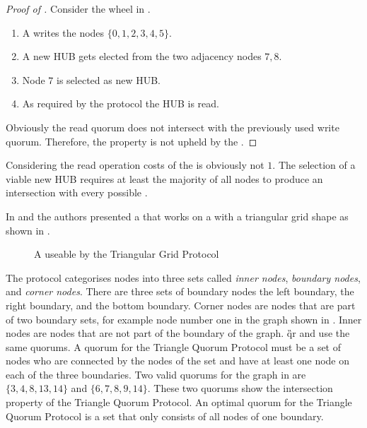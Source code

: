 \documentclass[conference]{IEEEtran}
\begin{document}
\begin{proof}[Proof of ]
Consider the wheel in .
\begin{enumerate}
	\item A  writes the nodes \(\{0,1,2,3,4,5\}\).
	\item A new HUB gets elected from the two adjacency nodes \(7,8\).
	\item Node \(7\) is selected as new HUB.
	\item As required by the protocol the HUB is read.
\end{enumerate}
Obviously the read quorum does not intersect with the previously used write
quorum.
Therefore, the  property is not upheld by the .
\end{proof}
Considering  the read operation costs of the
 is obviously not \(1\).
The selection of a viable new HUB requires at least the majority of all nodes
to produce an intersection with every possible .

In \cite{CJ98:tgp} and \cite{ChoW98} the authors presented a  that works
on a  with a triangular grid shape as shown in .
\begin{figure}[ht]
\centering
	
	\caption{A  useable by the Triangular Grid Protocol}
\label{fig:trigrid}
\end{figure}
The protocol categorises nodes into three sets called \emph{inner nodes},
\emph{boundary nodes}, and \emph{corner nodes}.
There are three sets of boundary nodes the left boundary, the right boundary,
and the bottom boundary.
Corner nodes are nodes that are part of two boundary sets, for example node
number one in the graph shown in .
Inner nodes are nodes that are not part of the boundary of the graph.
\G{qr} and  use the same quorums.
A quorum for the Triangle Quorum Protocol must be a set of nodes who are connected
by the nodes of the set and have at least one node on each of the three
boundaries.
Two valid quorums for the graph in  are \(\{3,4,8,13,14\}\)
and \(\{6,7,8,9,14\}\).
These two quorums show the intersection property of the Triangle Quorum
Protocol.
An optimal quorum for the Triangle Quorum Protocol is a set that only consists
of all nodes of one boundary.
\end{document}
